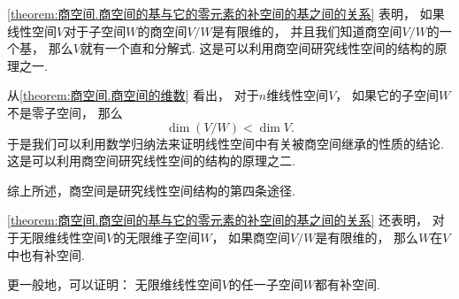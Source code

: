 \cref{theorem:商空间.商空间的基与它的零元素的补空间的基之间的关系} 表明，
如果线性空间\(V\)对于子空间\(W\)的商空间\(V/W\)是有限维的，
并且我们知道商空间\(V/W\)的一个基，
那么\(V\)就有一个直和分解式.
这是可以利用商空间研究线性空间的结构的原理之一.

从\cref{theorem:商空间.商空间的维数} 看出，
对于\(n\)维线性空间\(V\)，
如果它的子空间\(W\)不是零子空间，
那么\begin{equation*}
	\dim(V/W) < \dim V.
\end{equation*}
于是我们可以利用数学归纳法来证明线性空间中有关被商空间继承的性质的结论.
这是可以利用商空间研究线性空间的结构的原理之二.

综上所述，商空间是研究线性空间结构的第四条途径.

\cref{theorem:商空间.商空间的基与它的零元素的补空间的基之间的关系} 还表明，
对于无限维线性空间\(V\)的无限维子空间\(W\)，
如果商空间\(V/W\)是有限维的，
那么\(W\)在\(V\)中也有补空间.

更一般地，可以证明：
无限维线性空间\(V\)的任一子空间\(W\)都有补空间.

